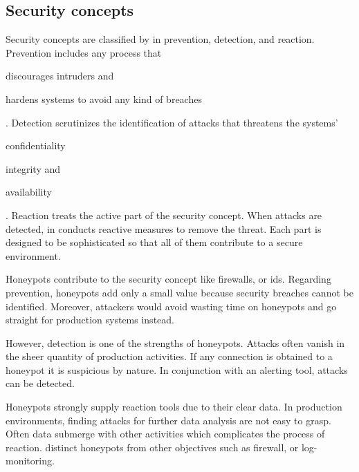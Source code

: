 \subsection{Security concepts}
\label{subsec:honeypot-security-concept}

Security concepts are classified by \citet{Schneier2004} in prevention, detection, and reaction.
Prevention includes any process that
\begin{enumerate*}[label=(\roman*)]
    \item discourages intruders and
    \item hardens systems to avoid any kind of breaches
\end{enumerate*}.
Detection scrutinizes the identification of attacks that threatens the systems'
\begin{enumerate*}[label=(\roman*)]
    \item confidentiality
    \item integrity and
    \item availability
\end{enumerate*}.
Reaction treats the active part of the security concept.
When attacks are detected, in conducts reactive measures to remove the threat.
Each part is designed to be sophisticated so that all of them contribute to a secure environment. \cite{NawrockiWSKS2016}

Honeypots contribute to the security concept like firewalls, or \ac{ids}. Regarding prevention, honeypots add only a small value because security breaches cannot be identified.
Moreover, attackers would avoid wasting time on honeypots and go straight for production systems instead.

However, detection is one of the strengths of honeypots.
Attacks often vanish in the sheer quantity of production activities.
If any connection is obtained to a honeypot it is suspicious by nature.
In conjunction with an alerting tool, attacks can be detected.

Honeypots strongly supply reaction tools due to their clear data.
In production environments, finding attacks for further data analysis are not easy to grasp.
Often data submerge with other activities which complicates the process of reaction. \cite{NawrockiWSKS2016}
\citet{NawrockiWSKS2016} distinct honeypots from other objectives such as firewall, or log-monitoring.

